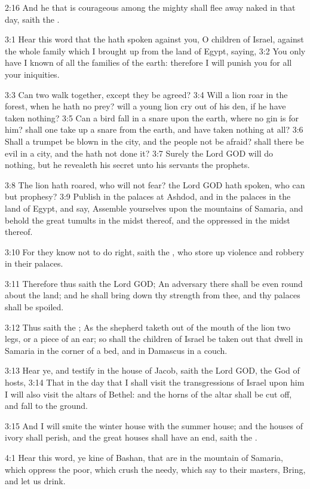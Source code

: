 2:16 And he that is courageous among the mighty shall flee away naked in that day, saith the \LORD.

3:1 Hear this word that the \LORD hath spoken against you, O children of Israel, against the whole family which I brought up from the land of Egypt, saying, 3:2 You only have I known of all the families of the earth: therefore I will punish you for all your iniquities.

3:3 Can two walk together, except they be agreed?  3:4 Will a lion roar in the forest, when he hath no prey? will a young lion cry out of his den, if he have taken nothing?  3:5 Can a bird fall in a snare upon the earth, where no gin is for him?  shall one take up a snare from the earth, and have taken nothing at all?  3:6 Shall a trumpet be blown in the city, and the people not be afraid?  shall there be evil in a city, and the \LORD hath not done it?  3:7 Surely the Lord GOD will do nothing, but he revealeth his secret unto his servants the prophets.

3:8 The lion hath roared, who will not fear? the Lord GOD hath spoken, who can but prophesy?  3:9 Publish in the palaces at Ashdod, and in the palaces in the land of Egypt, and say, Assemble yourselves upon the mountains of Samaria, and behold the great tumults in the midst thereof, and the oppressed in the midst thereof.

3:10 For they know not to do right, saith the \LORD, who store up violence and robbery in their palaces.

3:11 Therefore thus saith the Lord GOD; An adversary there shall be even round about the land; and he shall bring down thy strength from thee, and thy palaces shall be spoiled.

3:12 Thus saith the \LORD; As the shepherd taketh out of the mouth of the lion two legs, or a piece of an ear; so shall the children of Israel be taken out that dwell in Samaria in the corner of a bed, and in Damascus in a couch.

3:13 Hear ye, and testify in the house of Jacob, saith the Lord GOD, the God of hosts, 3:14 That in the day that I shall visit the transgressions of Israel upon him I will also visit the altars of Bethel: and the horns of the altar shall be cut off, and fall to the ground.

3:15 And I will smite the winter house with the summer house; and the houses of ivory shall perish, and the great houses shall have an end, saith the \LORD.

4:1 Hear this word, ye kine of Bashan, that are in the mountain of Samaria, which oppress the poor, which crush the needy, which say to their masters, Bring, and let us drink.

